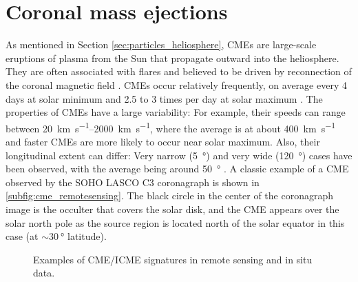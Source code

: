 \section{Coronal mass ejections}
\label{sec:cmes}

As mentioned in Section \ref{sec:particles_heliosphere}, \acp{CME} are large-scale eruptions of plasma from the Sun that propagate outward into the heliosphere. They are often associated with flares and believed to be driven by reconnection of the coronal magnetic field \citep[see e.g.][for discussions on the triggering mechanism]{Forbes-2000,Kusano-2012}. \acp{CME} occur relatively frequently, on average every 4 days at solar minimum and 2.5 to 3 times per day at solar maximum \citep{Webb-1994}. The properties of \acp{CME} have a large variability: For example, their speeds can range between \SIrange[range-phrase={\,and\,}]{20}{2000}{\kilo\meter\per\second}, where the average is at about \SI{400}{\kilo\meter\per\second} and faster \acp{CME} are more likely to occur near solar maximum. Also, their longitudinal extent can differ: Very narrow (\SI{5}{\degree}) and very wide (\SI{120}{\degree}) cases have been observed, with the average being around \SI{50}{\degree} \citep{Cane-2000}. A classic example of a \ac{CME} observed by the \ac{SOHO} \ac{LASCO} C3 coronagraph is shown in \autoref{subfig:cme_remotesensing}. The black circle in the center of the coronagraph image is the occulter that covers the solar disk, and the \ac{CME} appears over the solar north pole as the source region is located north of the solar equator in this case (at $\sim\SI{30}{\degree}$ latitude).

\begin{figure}
    \centering
	\hspace{5mm}
    \caption[Examples of \acs{CME} and \ac{ICME} signatures]{Examples of \acs{CME}/\ac{ICME} signatures in remote sensing and in situ data.}
    \label{fig:cme_icme_signatures}
\end{figure}

